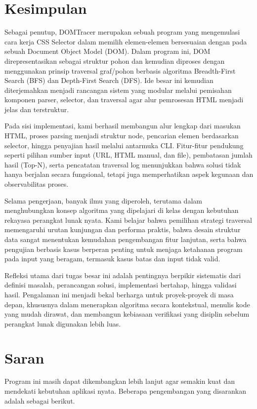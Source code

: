 \section{Kesimpulan}

Sebagai penutup, DOMTracer merupakan sebuah program yang mengemulasi cara kerja CSS Selector dalam memilih elemen-elemen bersesuaian dengan pada sebuah Document Object Model (DOM). Dalam program ini, DOM direpresentasikan sebagai struktur pohon dan kemudian diproses dengan menggunakan prinsip traversal graf/pohon berbasis algoritma Breadth-First Search (BFS) dan Depth-First Search (DFS). Ide besar ini kemudian diterjemahkan menjadi rancangan sistem yang modular melalui pemisahan komponen parser, selector, dan traversal agar alur pemrosesan HTML menjadi jelas dan terstruktur.

Pada sisi implementasi, kami berhasil membangun alur lengkap dari masukan HTML, proses parsing menjadi struktur node, pencarian elemen berdasarkan selector, hingga penyajian hasil melalui antarmuka CLI. Fitur-fitur pendukung seperti pilihan sumber input (URL, HTML manual, dan file), pembatasan jumlah hasil (Top-N), serta pencatatan traversal log menunjukkan bahwa solusi tidak hanya berjalan secara fungsional, tetapi juga memperhatikan aspek kegunaan dan observabilitas proses.

Selama pengerjaan, banyak ilmu yang diperoleh, terutama dalam menghubungkan konsep algoritma yang dipelajari di kelas dengan kebutuhan rekayasa perangkat lunak nyata. Kami belajar bahwa pemilihan strategi traversal memengaruhi urutan kunjungan dan performa praktis, bahwa desain struktur data sangat menentukan kemudahan pengembangan fitur lanjutan, serta bahwa pengujian berbasis kasus berperan penting untuk menjaga ketahanan program pada input yang beragam, termasuk kasus batas dan input tidak valid.

Refleksi utama dari tugas besar ini adalah pentingnya berpikir sistematis dari definisi masalah, perancangan solusi, implementasi bertahap, hingga validasi hasil. Pengalaman ini menjadi bekal berharga untuk proyek-proyek di masa depan, khususnya dalam menerapkan algoritma secara kontekstual, menulis kode yang mudah dirawat, dan membangun kebiasaan verifikasi yang disiplin sebelum perangkat lunak digunakan lebih luas.

\section{Saran}

Program ini masih dapat dikembangkan lebih lanjut agar semakin kuat dan mendekati kebutuhan aplikasi nyata. Beberapa pengembangan yang disarankan adalah sebagai berikut.

